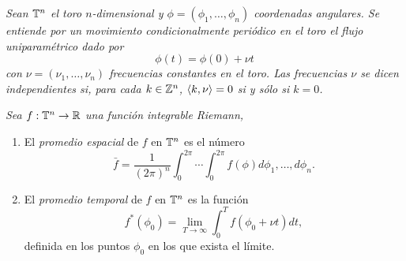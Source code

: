 \begin{defn}
  \em
  Sean $\mathbb{T}^n$ el toro $n$-dimensional y $\phi=(\phi_1,\dots,\phi_n)$ coordenadas angulares. Se entiende por un \emph{movimiento condicionalmente periódico} en el toro el flujo uniparamétrico dado por 
  \begin{equation*}
    \phi(t)=\phi(0)+\nu t
  \end{equation*}
  con $\nu=(\nu_1,\dots,\nu_n)$ \emph{frecuencias} constantes en el toro. Las frecuencias $\nu$ se dicen \emph{independientes} si, para cada $k \in \mathbb{Z}^n$,  $\left\langle k,\nu\right\rangle=0$ si y sólo si $k=0$.
\end{defn}
\begin{defn}
  \em
  Sea $f:\mathbb{T}^n \rightarrow \mathbb{R}$ una función integrable Riemann,
  \begin{enumerate}
    \item El \emph{promedio espacial} de $f$ en $\mathbb{T}^n$ es el número
      \begin{equation*}
	\bar{f}=\frac{1}{(2\pi)^n}\int_0^{2\pi} \cdots \int_0^{2\pi} f(\phi) d\phi_1,\dots,d\phi_n.
      \end{equation*}
    \item El \emph{promedio temporal} de $f$ en $\mathbb{T}^n$ es la función
      \begin{equation*}
	f^*(\phi_0)=\lim_{T\rightarrow \infty} \int_0^{T}f(\phi_0+\nu t) dt,
      \end{equation*}
      definida en los puntos $\phi_0$ en los que exista el límite.
  \end{enumerate}
\end{defn}

